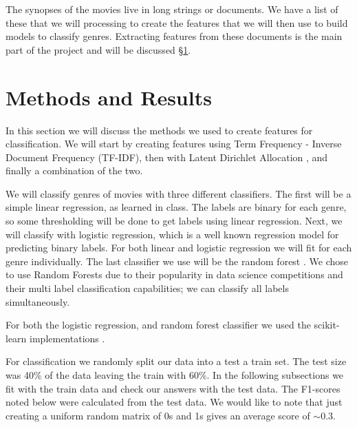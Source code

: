 \documentclass[11pt]{article}
\begin{document}


The synopses of the movies live in long strings or documents. We have a list of these that we will processing to create the features that we will then use to build models to classify genres. Extracting features from these documents is the main part of the project and will be discussed \S \ref{sec:methods}.

\section{Methods and Results}
\label{sec:methods}

In this section we will discuss the methods we used to create features for classification. We will start by creating features using Term Frequency - Inverse Document Frequency (TF-IDF), then with Latent Dirichlet Allocation \cite{blei2003}, and finally a combination of the two. 

We will classify genres of movies with three different classifiers. The first will be a simple linear regression, as learned in class. The labels are binary for each genre, so some thresholding will be done to get labels using linear regression. Next, we will classify with logistic regression, which is a well known regression model for predicting binary labels. For both linear and logistic regression we will fit for each genre individually. The last classifier we use will be the random forest \cite{breiman2001}. We chose to use Random Forests due to their popularity in data science competitions and their multi label classification capabilities; we can classify all labels simultaneously. 

For both the logistic regression, and random forest classifier we used the scikit-learn implementations \cite{scikit-learn}.

For classification we randomly split our data into a test a train set. The test size was 40\% of the data leaving the train with 60\%. In the following subsections we fit with the train data and check our answers with the test data. The F1-scores noted below were calculated from the test data. We would like to note that just creating a uniform random matrix of 0s and 1s gives an average score of $\sim0.3$.
\end{document}
